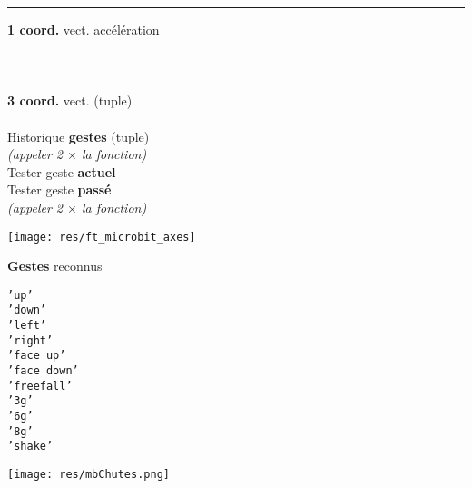 \begin{minipage}[t]{0.75\linewidth}
	\begin{methode}[Mouvement]
		\rule{-0.25em}{2em}\textbf{1 coord.} vect. accélération
		\hfill {}\\
		\hfill {}\\
		\hfill {}\\
		\hfill \ex {}\\
		
		\textbf{3 coord.} vect. (tuple)
		\hfill {}\\
		\hfill \ex {}\\
		
		Historique \textbf{gestes} (tuple)
		\hfill  {}\\
		\textit{\footnotesize (appeler 2 $\times$ la fonction)}
		\hfill \ex {}\\
		
		Tester geste \textbf{actuel}
		\hfill  {}\\
		
		Tester geste \textbf{passé}
		\hfill  {}\\
		\textit{\footnotesize (appeler 2 $\times$ la fonction)}		
	\end{methode}
\end{minipage}
\hfill
\begin{minipage}[t]{0.25\linewidth}
	\strut\vspace*{-\baselineskip}\newline
	\begin{center}
		\texttt{[image: res/ft\_microbit\_axes]}
	\end{center}
	
	\textbf{Gestes} reconnus
	\begin{multicols}{2}
		\texttt{'up'}\\
		\texttt{'down'}\\
		\texttt{'left'}\\
		\texttt{'right'}\\
		\texttt{'face up'}\\
		\texttt{'face down'}\\
		\texttt{'freefall'}\\
		\texttt{'3g'}\\
		\texttt{'6g'}\\
		\texttt{'8g'}\\
		\texttt{'shake'}
	\end{multicols}

	\hfill \texttt{[image: res/mbChutes.png]}
\end{minipage}





